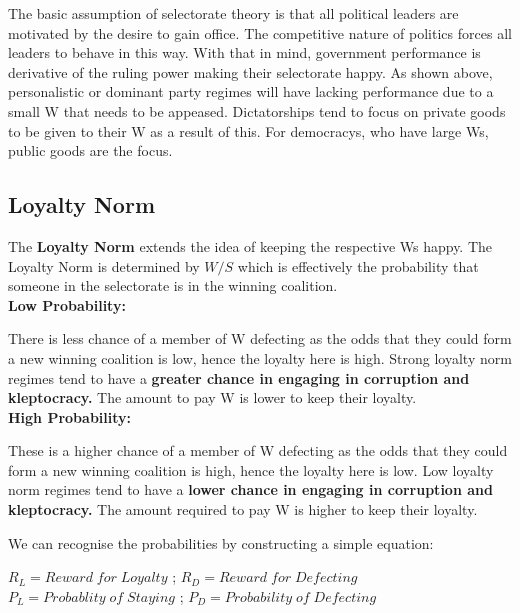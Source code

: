 \documentclass[12pt, letterpaper]{article}
\begin{document}
The basic assumption of selectorate theory is that all political leaders are motivated by the desire to gain office. The competitive nature of politics forces all leaders to behave in this way. With that in mind, government performance is derivative of the ruling power making their selectorate happy. As shown above, personalistic or dominant party regimes will have lacking performance due to a small W that needs to be appeased. Dictatorships tend to focus on private goods to be given to their W as a result of this. For democracys, who have large Ws, public goods are the focus.

\subsection{Loyalty Norm}
The \textbf{Loyalty Norm} extends the idea of keeping the respective Ws happy. The Loyalty Norm is determined by $W/S$ which is effectively the probability that someone in the selectorate is in the winning coalition. \\

\textbf{Low Probability:}

There is less chance of a member of W defecting as the odds that they could form a new winning coalition is low, hence the loyalty here is high. Strong loyalty norm regimes tend to have a \textbf{greater chance in engaging in corruption and kleptocracy.} The amount to pay W is lower to keep their loyalty. \\

\textbf{High Probability:}

These is a higher chance of a member of W defecting as the odds that they could form a new winning coalition is high, hence the loyalty here is low. Low loyalty norm regimes tend to have a \textbf{lower chance in engaging in corruption and kleptocracy.} The amount required to pay W is higher to keep their loyalty. 

\begin{center}

We can recognise the probabilities by constructing a simple equation:

$R_L = Reward\;for\;Loyalty$ ;
$R_D = Reward\;for\;Defecting$ \\
$P_L = Probablity\;of\;Staying$ ;
$P_D = Probability\;of\;Defecting$ \\

\end{center}
\end{document}
